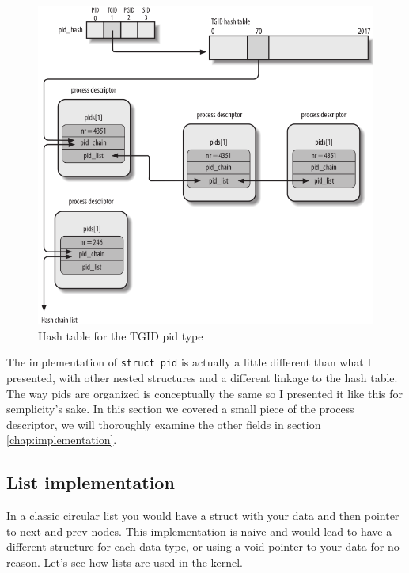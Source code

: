 \documentclass[10pt]{book}
\begin{document}
\begin{figure}[ht]
\includegraphics[width=\textwidth]{images/pidhash2.png}
\caption{Hash table for the TGID pid type}
\label{img:pidhash2}
\end{figure}

The implementation of \verb|struct pid| is actually a little different than what I presented, with other nested structures and a different linkage to the hash table. The way pids are organized is conceptually the same so I presented it like this for semplicity's sake. In this section we covered a small piece of the process descriptor, we will thoroughly examine the other fields in section \ref{chap:implementation}.


\subsection{List implementation} In a classic circular list you would have a struct with your data and then pointer to next and prev nodes. This implementation is naive and would lead to have a different structure for each data type, or using a void pointer to your data for no reason. Let's see how lists are used in the kernel.
\end{document}
